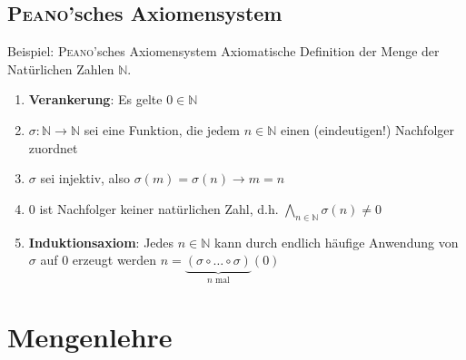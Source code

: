 \documentclass[]{beamer}
\begin{document}
\subsection{\textsc{Peano}'sches Axiomensystem}
\begin{frame}[squeeze]{}
  \begin{block}{Beispiel: \textsc{Peano}'sches Axiomensystem}
    Axiomatische Definition der Menge der Natürlichen Zahlen $\mathbb{N}$.
    \begin{enumerate}
      \item \textbf{Verankerung}: Es gelte $0 \in \mathbb{N}$
      \vspace*{1em}
      \item $\sigma \colon \mathbb{N} \to \mathbb{N}$ sei eine Funktion, die jedem $n \in \mathbb{N}$ einen (eindeutigen!) Nachfolger zuordnet
      \vspace*{1em}
      \item $\sigma$ sei injektiv, also $\sigma \left( m \right) = \sigma \left( n \right) \to m = n$
      \vspace*{1em}
      \item $0$ ist Nachfolger keiner natürlichen Zahl, d.h. $\underset{n \in \mathbb{N}}{\bigwedge} \sigma \left( n \right) \neq 0$
      \vspace*{1em}
      \item \textbf{Induktionsaxiom}: Jedes $n \in \mathbb{N}$ kann durch endlich häufige Anwendung von $\sigma$ auf $0$ erzeugt werden $n = \underbrace{\left( \sigma \circ \ldots \circ \sigma \right)}_{n \text{ mal}} \left( 0 \right)$
    \end{enumerate}
  \end{block}
\end{frame}



\section{Mengenlehre}
\end{document}
